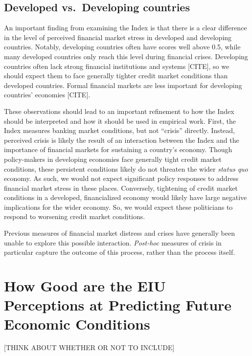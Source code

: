 \documentclass[]{article}
\begin{document}
\subsection{Developed vs.~Developing
countries}\label{developed-vs.developing-countries}

An important finding from examining the Index is that there is a clear
difference in the level of perceived financial market stress in
developed and developing countries. Notably, developing countries often
have scores well above 0.5, while many developed countries only reach
this level during financial crises. Developing countries often lack
strong financial institutions and systems {[}CITE{]}, so we should
expect them to face generally tighter credit market conditions than
developed countries. Formal financial markets are less important for
developing countries' economies {[}CITE{]}.

These observations should lead to an important refinement to how the
Index should be interpreted and how it should be used in empirical work.
First, the Index measures banking market conditions, but not ``crisis''
directly. Instead, perceived crisis is likely the result of an
interaction between the Index and the importance of financial markets
for sustaining a country's economy. Though policy-makers in developing
economies face generally tight credit market conditions, these
persistent conditions likely do not threaten the wider \emph{status quo}
economy. As such, we would not expect significant policy responses to
address financial market stress in these places. Conversely, tightening
of credit market conditions in a developed, financialized economy would
likely have large negative implications for the wider economy. So, we
would expect these politicians to respond to worsening credit market
conditions.

Previous measures of financial market distress and crises have generally
been unable to explore this possible interaction. \emph{Post-hoc}
measures of crisis in particular capture the outcome of this process,
rather than the process itself.

\section{How Good are the EIU Perceptions at Predicting Future Economic
Conditions}\label{how-good-are-the-eiu-perceptions-at-predicting-future-economic-conditions}

{[}THINK ABOUT WHETHER OR NOT TO INCLUDE{]}
\end{document}
